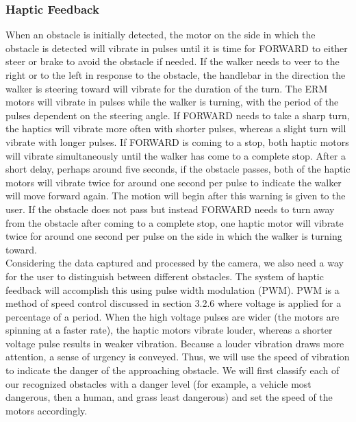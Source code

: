 \subsubsection{Haptic Feedback}
\noindent When an obstacle is initially detected, the motor on the side in which the obstacle is detected will vibrate in pulses until it is time for FORWARD to either steer or brake to avoid the obstacle if needed. If the walker needs to veer to the right or to the left in response to the obstacle, the handlebar in the direction the walker is steering toward will vibrate for the duration of the turn. The ERM motors will vibrate in pulses while the walker is turning, with the period of the pulses dependent on the steering angle. If FORWARD needs to take a sharp turn, the haptics will vibrate more often with shorter pulses, whereas a slight turn will vibrate with longer pulses. If FORWARD is coming to a stop, both haptic motors will vibrate simultaneously until the walker has come to a complete stop. After a short delay, perhaps around five seconds, if the obstacle passes, both of the haptic motors will vibrate twice for around one second per pulse to indicate the walker will move forward again. The motion will begin after this warning is given to the user. If the obstacle does not pass but instead FORWARD needs to turn away from the obstacle after coming to a complete stop, one haptic motor will vibrate twice for around one second per pulse on the side in which the walker is turning toward.\\ 

\noindent Considering the data captured and processed by the camera, we also need a way for the user to distinguish between different obstacles. The system of haptic feedback will accomplish this using pulse width modulation (PWM). PWM is a method of speed control discussed in section 3.2.6 where voltage is applied for a percentage of a period. When the high voltage pulses are wider (the motors are spinning at a faster rate), the haptic motors vibrate louder, whereas a shorter voltage pulse results in weaker vibration. Because a louder vibration draws more attention, a sense of urgency is conveyed. Thus, we will use the speed of vibration to indicate the danger of the approaching obstacle. We will first classify each of our recognized obstacles with a danger level (for example, a vehicle most dangerous, then a human, and grass least dangerous) and set the speed of the motors accordingly.

